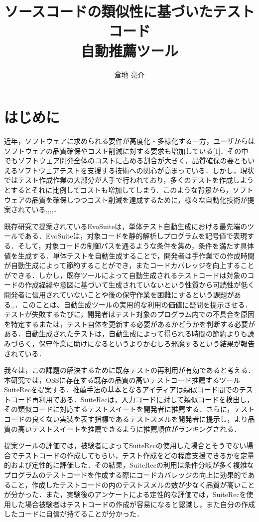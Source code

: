 \documentclass[12pt]{jarticle} %
\title{ソースコードの類似性に基づいたテストコード\\自動推薦ツール}
\author{倉地 亮介}
\begin{document}
%
%
\titlepage
\cmemberspage
\firstabstract
\secondabstract
%
%
\toc
\newpage
\listoffigures
\listoftables
%
%
\newpage
\section{はじめに}
近年，ソフトウェアに求められる要件が高度化・多様化する一方，ユーザからはソフトウェアの品質確保やコスト削減に対する要求も増加している[1]．その中でもソフトウェア開発全体のコストに占める割合が大きく，品質確保の要ともいえるソフトウェアテストを支援する技術への関心が高まっている\cite{b20}．しかし，現状ではテスト作成作業の大部分が人手で行われており，多くのテストを作成しようとするとそれに比例してコストも増加してしまう．このような背景から，ソフトウェアの品質を確保しつつコスト削減を達成するために，様々な自動化技術が提案されている\cite{b3},\cite{b16},\cite{b17},\cite{b18},\cite{b19}．

既存研究で提案されているEvoSuite\cite{b3}は，単体テスト自動生成における最先端のツールである．EvoSuiteは，対象コードを静的解析しプログラムを記号値で表現する．そして，対象コードの制御パスを通るような条件を集め，条件を満たす具体値を生成する．単体テストを自動生成することで，開発者は手作業での作成時間が自動生成によって節約することができ，またコードカバレッジを向上することができる．しかし，既存ツールによって自動生成されるテストコードは対象のコードの作成経緯や意図に基づいて生成されていないという性質から可読性が低く開発者に信用されていないことや後の保守作業を困難にするという課題がある\cite{b13},\cite{b14},\cite{b15}．このことは、自動生成ツールの実用的な利用の価値に疑問を提示させる．テストが失敗するたびに，開発者はテスト対象のプログラム内での不具合を原因を特定するまたは，テスト自体を更新する必要があるかどうかを判断する必要がある．自動生成されたテストは，自動生成によって得られる時間の節約よりも読みづらく，保守作業に助けになるというよりかむしろ邪魔するという結果が報告されている\cite{b1}．

我々は，この課題の解決するために既存テストの再利用が有効であると考える．本研究では，OSSに存在する既存の品質の高いテストコード推薦するツール{\sf SuiteRec}を提案する．推薦手法の基本となるアイディアは類似コード間でのテストコード再利用である．{\sf SuiteRec}は，入力コードに対して類似コードを検出し，その類似コードに対応するテストスイートを開発者に推薦する．さらに，テストコードの良くない実装を表す指標であるテストスメルを開発者に提示し，より品質の高いテストスイートを推薦できるように推薦順位がランキングされる．

提案ツールの評価では，被験者によって{\sf SuiteRec}の使用した場合とそうでない場合でテストコードの作成してもらい，テスト作成をどの程度支援できるかを定量的および定性的に評価した．その結果，{\sf SuiteRec}の利用は条件分岐が多く複雑なプログラムのテストコードを作成する際にコードカバレッジの向上に効果的であること，作成したテストコードの内のテストスメルの数が少なく品質が高いことが分かった．また，実験後のアンケートによる定性的な評価では，{\sf SuiteRec}を使用した場合被験者はテストコードの作成が容易になると認識し，また自分の作成したコードに自信が持てることが分かった．
\end{document}

